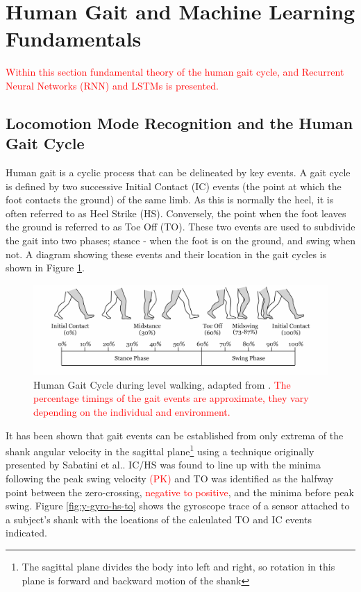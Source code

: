 \documentclass[sensors,article,submit,moreauthors,pdftex]{Definitions/mdpi}
\begin{document}
\section{Human Gait and Machine Learning Fundamentals}
\label{sec:theory}
\textcolor{red}{Within this section fundamental theory of the human gait cycle, and Recurrent Neural Networks (RNN) and LSTMs is presented.}

\subsection{Locomotion Mode Recognition and the Human Gait Cycle}

Human gait is a cyclic process that can be delineated by key events. A gait cycle is defined by two successive Initial Contact (IC) events (the point at which the foot contacts the ground) of the same limb. As this is normally the heel, it is often referred to as Heel Strike (HS). Conversely, the point when the foot leaves the ground is referred to as Toe Off (TO). These two events are used to subdivide the gait into two phases; stance - when the foot is on the ground, and swing when not. A diagram showing these events and their location in the gait cycles is shown in Figure \ref{fig:gait_cycle}.

\begin{figure}[!htb]
    \centering
    \includegraphics[width=\textwidth]{Figures/Gait_Cycle.jpg}
    \caption{Human Gait Cycle during level walking, adapted from \cite{humanGaitCycle2016}. \textcolor{red}{The percentage timings of the gait events are approximate, they vary depending on the individual and environment.}}
    \label{fig:gait_cycle}
\end{figure}

It has been shown that gait events can be established from only extrema of the shank angular velocity in the sagittal plane\footnote{The sagittal plane divides the body into left and right, so rotation in this plane is forward and backward motion of the shank} using a technique originally presented by Sabatini et al.\cite{Sabatini2005}. IC/HS was found to line up with the minima following the peak swing velocity \textcolor{red}{(PK)} and TO was identified as the halfway point between the zero-crossing, \textcolor{red}{negative to positive}, and the minima before peak swing. Figure \ref{fig:y-gyro-hs-to} shows the gyroscope trace of a sensor attached to a subject's shank with the locations of the calculated TO and IC events indicated.
\end{document}
